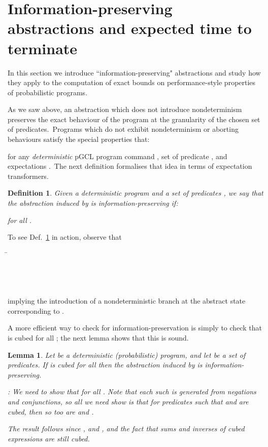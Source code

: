 \documentclass[numbers,copyright,creativecommons]{eptcs}
\newcommand{\Wp}{\mbox{\sf wp}}
\newtheorem{Lems}{Lemma} \newcommand{\Lem}[1]{Lem.~\ref{#1}}
\newtheorem{Defns}{Definition}\newtheorem{Corl}{Corollary}\newcommand{\Def}[1]{Def.~\ref{#1}}
\newcommand{\Proof}{\noindent{\bf Proof}: \quad}
\newenvironment{Reason}{\begin{tabbing}\hspace{4em}\=\kill}{\end{tabbing}\vspace{-2.5ex}}
\newcommand{\Step}[2]{#1 \>  \\}
\begin{document}
\section{Information-preserving abstractions and expected time to terminate}\label{PDI}

In this section we introduce ``information-preserving" abstractions and study how they apply to the computation of exact bounds on performance-style properties of probabilistic programs.

As we saw above, an abstraction which does not introduce nondeterminism preserves the exact behaviour of the program at the granularity of the chosen set of predicates.\ Programs which do not exhibit nondeterminism or aborting behaviours satisfy the special properties that:

for any {\it deterministic} pGCL program command , set of predicate , and  expectations .\ The next definition formalises that idea in terms of expectation transformers.

\begin{Defns}\label{d0636}
Given a deterministic program  and a set of predicates , we say that the abstraction induced by  is
\emph{information-preserving} if:

for all .
\end{Defns}

To see \Def{d0636} in action, observe that

\begin{Reason}
\Step{}
{\Wp.\textit{inc}.[x=0 \lor x=2]}
\Step{}
{ [x=0 \lor x=3]/2 {+} [x=1]}
\Step{}
{[x=1 \lor x=3]/2}
\Step{}
{ \Wp_\Phi.\textit{inc}.[x=0 \lor x=2] ~, }
\end{Reason}
implying the introduction of a nondeterministic branch at the abstract state corresponding to .

A more efficient way to check for information-preservation is simply to check that  is cubed for all ; the next lemma shows that this is sound.

\begin{Lems}\label{l1307}
Let  be a deterministic (probabilistic) program, and let  be a set of predicates.
If  is cubed for all  then the abstraction induced by  is information-preserving.

\Proof
We need to show that  for all . Note that each such  is generated from negations and conjunctions, so all we need show is that for predicates  such that  and  are cubed, then so too are  and .

The result follows since , and
, and the fact that sums and inverses of cubed expressions are still cubed.
\end{Lems}
\end{document}
